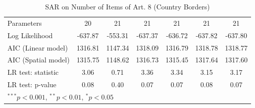 \begin{table}[!h]
\begin{center}
\begin{tabular}{l c c c c c c }
Parameters              & 20           & 21           & 21           & 21           & 21           & 21           \\
Log Likelihood          & -637.87      & -553.31      & -637.37      & -636.72      & -637.82      & -637.80      \\
AIC (Linear model)      & 1316.81      & 1147.34      & 1318.09      & 1316.79      & 1318.78      & 1318.77      \\
AIC (Spatial model)     & 1315.75      & 1148.62      & 1316.73      & 1315.45      & 1317.64      & 1317.60      \\
LR test: statistic      & 3.06         & 0.71         & 3.36         & 3.34         & 3.15         & 3.17         \\
LR test: p-value        & 0.08         & 0.40         & 0.07         & 0.07         & 0.08         & 0.07         \\
\bottomrule
\multicolumn{7}{l}{\scriptsize{$^{***}p<0.001$, $^{**}p<0.01$, $^*p<0.05$}}
\end{tabular}
\caption{SAR on Number of Items of Art. 8 (Country Borders)}
\label{table:coefficients}
\end{center}
\end{table}
